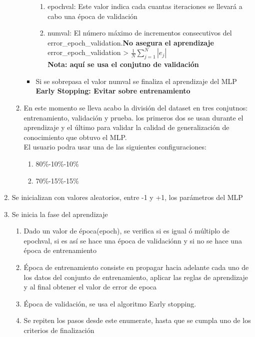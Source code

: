 \documentclass{article}
\begin{document}
\begin{enumerate}
\begin{enumerate}
\begin{itemize}
		\begin{enumerate}
			\item epochval: Este valor indica cada cuantas iteraciones se llevará a cabo una época de validación
			\item numval: El número máximo de incrementos consecutivos del error\_epoch\_validation.\textbf{No asegura el aprendizaje}\\
			error\_epoch\_validation > $\frac{1}{N}\sum_{j=1}^{N}| e_j|$\\
			\textbf{Nota: aquí se usa el conjutno de validación}
		\end{enumerate}
		\item Si se sobrepasa el valor numval se finaliza el aprendizaje del MLP\\
		\textbf{Early Stopping: Evitar sobre entrenamiento}
	\end{itemize}
	\item En este momento se lleva acabo la división del dataset en tres conjutnos: entrenamiento, validación y prueba. los primeros dos se usan durante el aprendizaje y el último para validar la calidad de generalización de conocimiento que obtuvo el MLP.\\
	El usuario podra usar una de las siguientes configuraciones:
	\begin{enumerate}
		\item 80\%-10\%-10\%
		\item 70\%-15\%-15\%
	\end{enumerate}
	\end{enumerate}
	\item Se inicializan con valores aleatorios, entre -1 y +1, los parámetros del MLP
	\item Se inicia la fase del aprendizaje
	\begin{enumerate}
		\item Dado un valor de época(epoch), se verifica si es igual ó múltiplo de epochval, si es así se hace una época de validaciónn y si no se hace una época de entrenamiento
		\item Época de entrenamiento consiste en propagar hacia adelante cada uno de los datos del conjunto de entrenamiento, aplicar las reglas de aprendizaje y al final obtener el valor de error de epoca
		\item Época de validación, se usa el algoritmo Early stopping.
		\item Se repiten los pasos desde este enumerate, hasta que se cumpla uno de los criterios de finalización
	\end{enumerate}

\end{enumerate}
\end{document}
